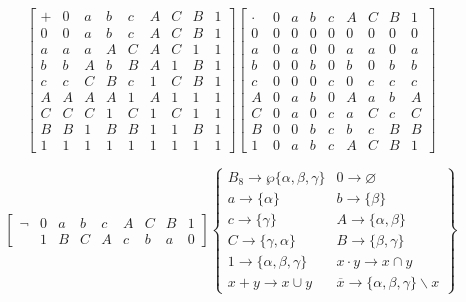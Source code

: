 \documentclass[
]{article}
\begin{document}
\begin{enumerate}
  \[\begin{bmatrix}
   + & 0 & a & b & c & A & C & B & 1 \\
  0 & 0 & a & b & c & A & C & B & 1 \\
  a & a & a & A & C & A & C & 1 & 1 \\
  b & b & A & b & B & A & 1 & B & 1 \\
  c & c & C & B & c & 1 & C & B & 1 \\
  A & A & A & A & 1 & A & 1 & 1 & 1 \\
  C & C & C & 1 & C & 1 & C & 1 & 1 \\
  B & B & 1 & B & B & 1 & 1 & B & 1 \\
  1 & 1 & 1 & 1 & 1 & 1 & 1 & 1 & 1
  \end{bmatrix}\begin{bmatrix}
   \cdot & 0 & a & b & c & A & C & B & 1 \\
  0 & 0 & 0 & 0 & 0 & 0 & 0 & 0 & 0 \\
  a & 0 & a & 0 & 0 & a & a & 0 & a \\
  b & 0 & 0 & b & 0 & b & 0 & b & b \\
  c & 0 & 0 & 0 & c & 0 & c & c & c \\
  A & 0 & a & b & 0 & A & a & b & A \\
  C & 0 & a & 0 & c & a & C & c & C \\
  B & 0 & 0 & b & c & b & c & B & B \\
  1 & 0 & a & b & c & A & C & B & 1
  \end{bmatrix}\]

  \[\begin{bmatrix}
  \neg & 0 & a & b & c & A & C & B & 1 \\
   & 1 & B & C & A & c & b & a & 0
  \end{bmatrix}\begin{Bmatrix}
  {{B_{8}\rightarrow\wp}{\{{\alpha,\beta,\gamma}\}}} & {0\rightarrow\varnothing} \\
  {a\rightarrow{\{\alpha\}}} & {b\rightarrow{\{\beta\}}} \\
  {c\rightarrow{\{\gamma\}}} & {A\rightarrow{\{{\alpha,\beta}\}}} \\
  {C\rightarrow{\{{\gamma,\alpha}\}}} & {B\rightarrow{\{{\beta,\gamma}\}}} \\
  {1\rightarrow{\{{\alpha,\beta,\gamma}\}}} & {{x \cdot y}\rightarrow{x \cap y}} \\
  {{x + y}\rightarrow{x \cup y}} & {\overline{x}\rightarrow{{\{{\alpha,\beta,\gamma}\}} \smallsetminus x}}
  \end{Bmatrix}\]


\end{enumerate}
\end{document}
